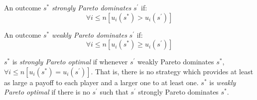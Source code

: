 \documentclass[12pt]{article}
\begin{document}
An outcome $s^*$ \emph{strongly Pareto dominates} $s^\prime$ if:
\begin{displaymath}
\forall i\leq n \left[u_i(s^*)>u_i(s^\prime)\right]
\end{displaymath}

An outcome $s^*$ \emph{weakly Pareto dominates} $s^\prime$ if:
\begin{displaymath}
\forall i\leq n \left[u_i(s^*)\geq u_i(s^\prime)\right]
\end{displaymath}

$s^*$ is \emph{strongly Pareto optimal} if whenever $s^\prime$ weakly Pareto dominates $s^*$, $\forall i\leq n\left[u_i(s^*)=u_i(s^\prime)\right]$.  That is, there is no strategy which provides at least as large a payoff to each player and a larger one to at least one.
$s^*$ is \emph{weakly Pareto optimal} if there is no $s^\prime$ such that $s^\prime$ strongly Pareto dominates $s^*$.
\end{document}
